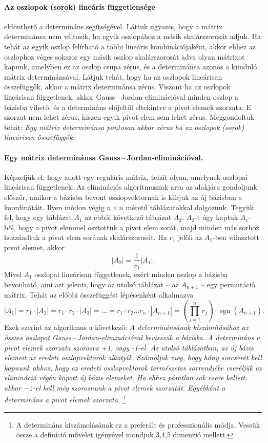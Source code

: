 \documentclass[a4paper, showtrims]{memoir}
\theoremstyle{plain}
\theoremstyle{remark}
\theoremstyle{definition}
\DeclareMathOperator{\sgn}{sgn}
\begin{document}
\paragraph{Az oszlopok (sorok) lineáris függetlensége} eldönthető a determináns segítségével.
Láttuk ugyanis, hogy a mátrix determinánsa nem változik, ha egyik oszlopához a másik skalárszorosát adjuk.
Ha tehát az egyik oszlop felírható a többi lineáris kombinációjaként,
akkor ehhez az oszlophoz véges sokszor egy másik oszlop skalárszorosát adva olyan mátrixot kapunk,
amelyben ez az oszlop csupa zérus, és a determinánsa azonos a kiinduló mátrix determinánsával.
Látjuk tehát, hogy ha az oszlopok lineárisan összefüggők, akkor a mátrix determinánsa zérus.
Viszont ha az oszlopok lineárisan függetlenek,
akkor Gauss\,--\,Jordan-eliminációval minden oszlop a bázisba vihető, és a determináns előjeltől eltekintve a pivot elemek szorzata.
E szorzat nem lehet zérus, hiszen egyik pivot elem sem lehet zérus.
Meggondoltuk tehát:
\emph{
	Egy mátrix determinánsa pontosan akkor zérus ha az oszlopok (sorok) lineárisan összefüggők.
}

\paragraph{Egy mátrix determinánsa Gauss\,--\,Jordan-eliminációval.}
Képzeljük el, hogy adott egy reguláris mátrix, tehát olyan, amelynek oszlopai lineárisan függetlenek.
Az eliminációs algoritmusnak arra az alakjára gondoljunk először, amikor a bázisba bevont oszlopvektornak
is kiírjuk az új bázisban a koordinátáit.
Ilyen módon végig $n\times n$ méretű táblázatokkal dolgozunk.
Tegyük fel, hogy egy táblázat $A_1$ az ebből következő táblázat $A_2$.
$A_2$-t úgy kaptuk $A_1$-ből, hogy a pivot elemmel osztottuk a pivot elem sorát,
majd minden más sorhoz hozzáadtuk a pivot elem sorának skalárszorosát.
Ha $r_1$ jelöli az $A_1$-ben választott pivot elemet, akkor
\[
	|A_2|=\frac{1}{r_1}|A_1|.
\]
Mivel $A_1$ oszlopai lineárisan függetlenek, ezért minden oszlop a bázisba bevonható,
ami azt jelenti, hogy az utolsó táblázat -- az $A_{n+1}$ -- egy permutáció mátrix.
Tehát az előbbi összefüggést lépésenként alkalmazva
\[
	|A_1|=r_1\cdot |A_2|=r_1\cdot r_2\cdot |A_3|=\dots=r_1\cdot r_2\dots r_{n}\cdot|A_{n+1}|=\left(\prod_{j=1}^nr_j  \right)\cdot\sgn(A_{n+1}).
\]
Ezek szerint az algoritmus a következő:
\emph{
	$A$ determinánsának kiszámításához az összes oszlopot Gauss\,--\,Jordan-eliminációval bevisszük a bázisba.
	A determináns a pivot elemek szorzata szorozva +1, vagy -1-el.
	Az utolsó táblázatban, az új bázis elemeit az eredeti oszlopvektorok alkotják.
	Számoljuk meg, hogy hány sorcserét kell kapnunk ahhoz, hogy az eredeti oszlopvektorok természetes sorrendjébe cseréljük az elimináció
	végén kapott új bázis elemeket.
	Ha ehhez páratlan sok csere kellett, akkor $-1$-el kell még szoroznunk a pivot elemek szorzatát.
	Egyébként a determináns a pivot elemek szorzata.
	\footnote{
		A determináns kiszámolásának ez a preferált és professzionális módja.
		Vessük össze a definíció művelet igényével mondjuk 3,4,5 dimenzió mellett.}
}
\end{document}
